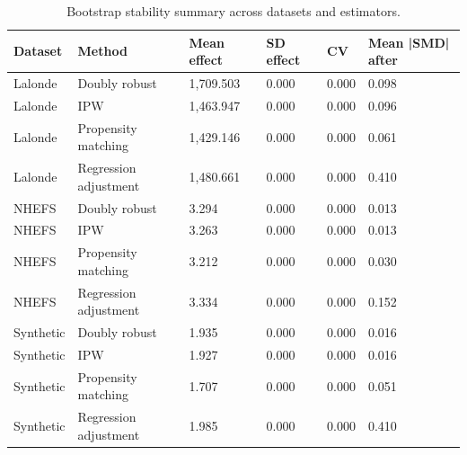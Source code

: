 \begin{table}[t!]
\centering
\footnotesize
\caption{Bootstrap stability summary across datasets and estimators.}
\label{tab:paper-stability-summary}
\setlength{\tabcolsep}{4.5pt}
\begin{tabular}{llllll}
\hline
Dataset & Method & Mean effect & SD effect & CV & Mean |SMD| after \\
\hline
Lalonde & Doubly robust & 1,709.503 & 0.000 & 0.000 & 0.098 \\
Lalonde & IPW & 1,463.947 & 0.000 & 0.000 & 0.096 \\
Lalonde & Propensity matching & 1,429.146 & 0.000 & 0.000 & 0.061 \\
Lalonde & Regression adjustment & 1,480.661 & 0.000 & 0.000 & 0.410 \\
NHEFS & Doubly robust & 3.294 & 0.000 & 0.000 & 0.013 \\
NHEFS & IPW & 3.263 & 0.000 & 0.000 & 0.013 \\
NHEFS & Propensity matching & 3.212 & 0.000 & 0.000 & 0.030 \\
NHEFS & Regression adjustment & 3.334 & 0.000 & 0.000 & 0.152 \\
Synthetic & Doubly robust & 1.935 & 0.000 & 0.000 & 0.016 \\
Synthetic & IPW & 1.927 & 0.000 & 0.000 & 0.016 \\
Synthetic & Propensity matching & 1.707 & 0.000 & 0.000 & 0.051 \\
Synthetic & Regression adjustment & 1.985 & 0.000 & 0.000 & 0.410 \\
\hline
\end{tabular}
\end{table}
